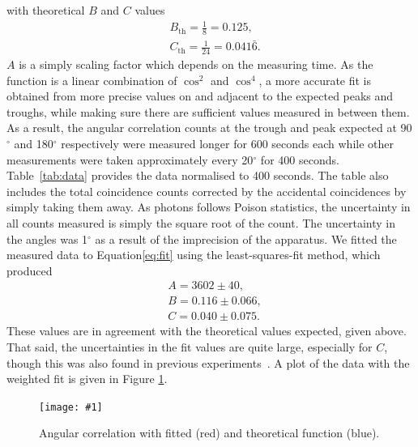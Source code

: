 \documentclass[twocolumn]{article}
\newcommand{\insertFigure}[1]{%
   \texttt{[image: \#1]}%
}
\begin{document}
with theoretical $B$ and $C$ values~\cite{sieg}
\begin{align*}
&B_{\text{th}} = \frac{1}{8} = 0.125,\\
&C_{\text{th}} = \frac{1}{24} = 0.041\bar{6}.
\end{align*}
$A$ is a simply scaling factor which depends on the measuring time. As the function is a linear combination of $\cos^2$ and $\cos^4$, a more accurate fit is obtained from more precise values on and adjacent to the expected peaks and troughs, while making sure there are sufficient values measured in between them. As a result, the angular correlation counts at the trough and peak expected at 90$^{\circ}$ and 180$^{\circ}$ respectively were measured longer for 600 seconds each while other measurements were taken approximately every 20$^{\circ}$ for 400 seconds. Table~\ref{tab:data} provides the data normalised to 400 seconds. The table also includes the total coincidence counts corrected by the accidental coincidences by simply taking them away. As photons follows Poison statistics, the uncertainty in all counts measured is simply the square root of the count. The uncertainty in the angles was 1$^\circ$ as a result of the imprecision of the apparatus. We fitted the measured data to Equation\ref{eq:fit} using the least-squares-fit method, which produced
\begin{align*}
&A = 3602 \pm 40,\\
&B = 0.116  \pm 0.066,\\
&C = 0.040 \pm 0.075.
\end{align*}
These values are in agreement with the theoretical values expected, given above. That said, the uncertainties in the fit values are quite large, especially for $C$, though this was also found in previous experiments~\cite{meliss}. A plot of the data with the weighted fit is given in Figure \ref{fig:angular}.
\begin{figure}
\centering
\insertFigure{angular.png}
\caption{Angular correlation with fitted (red) and theoretical function (blue).}
\label{fig:angular}
\end{figure}
\end{document}

